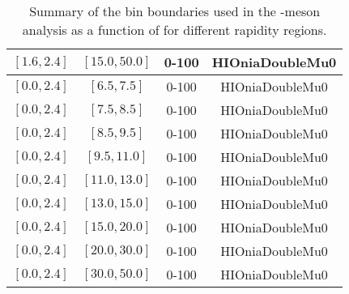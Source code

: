 \begin{table}[htb!]
\begin{tabular}{|c|c|c|c|}
  $[1.6,2.4]$ & $[15.0,50.0]$ & 0-100 & HIOniaDoubleMu0 \\
  \hline
  $[0.0,2.4]$ & $[6.5,7.5]$ & 0-100 & HIOniaDoubleMu0 \\
  $[0.0,2.4]$ & $[7.5,8.5]$ & 0-100 & HIOniaDoubleMu0 \\
  $[0.0,2.4]$ & $[8.5,9.5]$ & 0-100 & HIOniaDoubleMu0 \\
  $[0.0,2.4]$ & $[9.5,11.0]$ & 0-100 & HIOniaDoubleMu0 \\
  $[0.0,2.4]$ & $[11.0,13.0]$ & 0-100 & HIOniaDoubleMu0 \\
  $[0.0,2.4]$ & $[13.0,15.0]$ & 0-100 & HIOniaDoubleMu0 \\
  $[0.0,2.4]$ & $[15.0,20.0]$ & 0-100 & HIOniaDoubleMu0 \\
  $[0.0,2.4]$ & $[20.0,30.0]$ & 0-100 & HIOniaDoubleMu0 \\
  $[0.0,2.4]$ & $[30.0,50.0]$ & 0-100 & HIOniaDoubleMu0 \\
  \hline
 \end{tabular}
 \caption{Summary of the bin boundaries used in the \JPsi-meson \raa analysis as a function of \pt for different rapidity regions.}
 \label{tab:anabinsPt}
\end{table}

